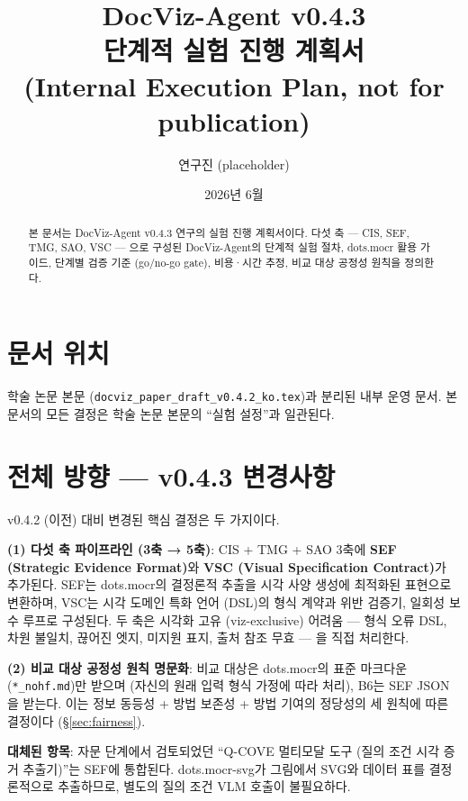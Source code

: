 \documentclass[11pt]{article}
\title{DocViz-Agent v0.4.3 \\
       단계적 실험 진행 계획서 \\
       \large{(Internal Execution Plan, not for publication)}}
\author{연구진 (placeholder)}
\date{2026년 6월}
\begin{document}
\maketitle

\begin{abstract}
본 문서는 DocViz-Agent v0.4.3 연구의 실험 진행 계획서이다. 다섯 축 — CIS, SEF, TMG, SAO, VSC — 으로 구성된 DocViz-Agent의 단계적 실험 절차, dots.mocr 활용 가이드, 단계별 검증 기준 (go/no-go gate), 비용·시간 추정, 비교 대상 공정성 원칙을 정의한다.
\end{abstract}

\section{문서 위치}

학술 논문 본문 (\texttt{docviz\_paper\_draft\_v0.4.2\_ko.tex})과 분리된 내부 운영 문서. 본 문서의 모든 결정은 학술 논문 본문의 ``실험 설정''과 일관된다.

\section{전체 방향 — v0.4.3 변경사항}

v0.4.2 (이전) 대비 변경된 핵심 결정은 두 가지이다.

\textbf{(1) 다섯 축 파이프라인 (3축 → 5축)}: CIS + TMG + SAO 3축에 \textbf{SEF (Strategic Evidence Format)}와 \textbf{VSC (Visual Specification Contract)}가 추가된다. SEF는 dots.mocr의 결정론적 추출을 시각 사양 생성에 최적화된 표현으로 변환하며, VSC는 시각 도메인 특화 언어 (DSL)의 형식 계약과 위반 검증기, 일회성 보수 루프로 구성된다. 두 축은 시각화 고유 (viz-exclusive) 어려움 — 형식 오류 DSL, 차원 불일치, 끊어진 엣지, 미지원 표지, 출처 참조 무효 — 을 직접 처리한다.

\textbf{(2) 비교 대상 공정성 원칙 명문화}: 비교 대상은 dots.mocr의 표준 마크다운 (\texttt{*\_nohf.md})만 받으며 (자신의 원래 입력 형식 가정에 따라 처리), B6는 SEF JSON을 받는다. 이는 정보 동등성 + 방법 보존성 + 방법 기여의 정당성의 세 원칙에 따른 결정이다 (\S \ref{sec:fairness}).

\textbf{대체된 항목}: 자문 단계에서 검토되었던 ``Q-COVE 멀티모달 도구 (질의 조건 시각 증거 추출기)''는 SEF에 통합된다. dots.mocr-svg가 그림에서 SVG와 데이터 표를 결정론적으로 추출하므로, 별도의 질의 조건 VLM 호출이 불필요하다.
\end{document}
